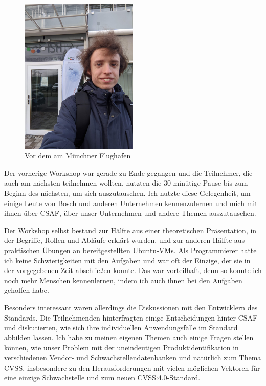 \begin{figure}[htbp] %
    \centering
    \includegraphics[width=0.5\textwidth, keepaspectratio]{res/img/2023-12-14-yan-vor-dem-ish-muenchen}
    \caption{Vor dem  am Münchner Flughafen}
    \label{fig:yan-ish-csaf-muenchen}
\end{figure}

Der vorherige Workshop war gerade zu Ende gegangen und die Teilnehmer, die auch am nächsten teilnehmen wollten, nutzten die 30-minütige Pause bis zum Beginn des nächsten, um sich auszutauschen.
Ich nutzte diese Gelegenheit, um einige Leute von Bosch und anderen Unternehmen kennenzulernen und mich mit ihnen über CSAF, über unser Unternehmen und andere Themen auszutauschen.

Der Workshop selbst bestand zur Hälfte aus einer theoretischen Präsentation, in der Begriffe, Rollen und Abläufe erklärt wurden, und zur anderen Hälfte aus praktischen Übungen an bereitgestellten Ubuntu-VMs.
Als Programmierer hatte ich keine Schwierigkeiten mit den Aufgaben und war oft der Einzige, der sie in der vorgegebenen Zeit abschließen konnte.
Das war vorteilhaft, denn so konnte ich noch mehr Menschen kennenlernen, indem ich auch ihnen bei den Aufgaben geholfen habe.

Besonders interessant waren allerdings die Diskussionen mit den Entwicklern des Standards.
Die Teilnehmenden hinterfragten einige Entscheidungen hinter CSAF und diskutierten, wie sich ihre individuellen Anwendungsfälle im Standard abbilden lassen.
Ich habe zu meinen eigenen Themen auch einige Fragen stellen können, wie unser Problem mit der uneindeutigen Produktidentifikation in verschiedenen Vendor- und Schwachstellendatenbanken und natürlich zum Thema CVSS, insbesondere zu den Herausforderungen mit vielen möglichen Vektoren für eine einzige Schwachstelle und zum neuen CVSS:4.0-Standard.

